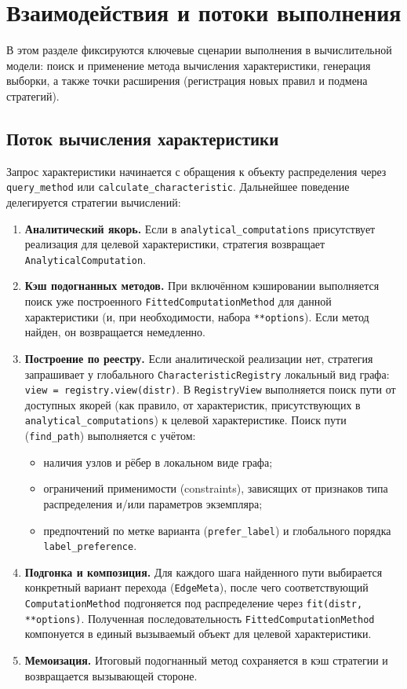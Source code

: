 \section{Взаимодействия и потоки выполнения}
\label{sec:interactions}

В этом разделе фиксируются ключевые сценарии выполнения в вычислительной модели: поиск и применение метода вычисления характеристики, генерация выборки, а также точки расширения (регистрация новых правил и подмена стратегий).

\subsection{Поток вычисления характеристики}

Запрос характеристики начинается с обращения к объекту распределения через \texttt{query\_method} или \texttt{calculate\_characteristic}. Дальнейшее поведение делегируется стратегии вычислений:\begin{enumerate}[compact]
      \item \textbf{Аналитический якорь.} Если в \texttt{analytical\_computations} присутствует реализация для целевой характеристики, стратегия возвращает \texttt{AnalyticalComputation}.
      \item \textbf{Кэш подогнанных методов.} При включённом кэшировании выполняется поиск уже построенного \texttt{FittedComputationMethod} для данной характеристики (и, при необходимости, набора \texttt{**options}). Если метод найден, он возвращается немедленно.
      \item \textbf{Построение по реестру.} Если аналитической реализации нет, стратегия запрашивает у глобального \texttt{CharacteristicRegistry} локальный вид графа: \texttt{view = registry.view(distr)}. В \texttt{RegistryView} выполняется поиск пути от доступных якорей (как правило, от характеристик, присутствующих в \texttt{analytical\_computations}) к целевой характеристике. Поиск пути (\texttt{find\_path}) выполняется с учётом:
            \begin{itemize}[compact]
                  \item наличия узлов и рёбер в локальном виде графа;
                  \item ограничений применимости (constraints), зависящих от признаков типа распределения и/или параметров экземпляра;
                  \item предпочтений по метке варианта (\texttt{prefer\_label}) и глобального порядка \texttt{label\_preference}.
            \end{itemize}
      \item \textbf{Подгонка и композиция.} Для каждого шага найденного пути выбирается конкретный вариант перехода (\texttt{EdgeMeta}), после чего соответствующий \texttt{ComputationMethod} подгоняется под распределение через \texttt{fit(distr, **options)}. Полученная последовательность \texttt{FittedComputationMethod} компонуется в единый вызываемый объект для целевой характеристики.
      \item \textbf{Мемоизация.} Итоговый подогнанный метод сохраняется в кэш стратегии и возвращается вызывающей стороне.
\end{enumerate}

